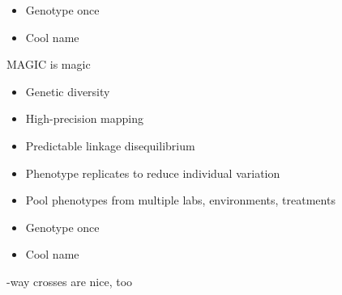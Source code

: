 \documentclass[12pt]{article}
\newcommand{\headsize}{\fontsize{35}{35} \selectfont}
\newcommand{\smallsize}{\fontsize{25}{30} \selectfont}
\begin{document}
{\begin{minipage}{10in}
\begin{itemize}
\item Genotype once

\color{mybgcolor}
\item Cool name

\end{itemize}
\end{minipage}



\newpage

\addtocounter{page}{-1}

\headsize \color{myyellow}
\hfill \begin{minipage}{5.75in}
\centering
MAGIC is magic
\end{minipage}

\vspace{25mm}

\color{mywhite}
\smallsize

\hfill \begin{minipage}{10in}
\begin{itemize}
\itemsep24pt
\item Genetic diversity

\item High-precision mapping

\item Predictable linkage disequilibrium

\item Phenotype replicates to reduce individual variation

\item Pool phenotypes from multiple labs, environments, treatments

\item Genotype once

\color{myblue}
\item Cool name

\end{itemize}
\end{minipage}

\newpage


\headsize \color{myyellow}
\hfill \begin{minipage}{6.25in}
-way crosses are nice, too
\end{minipage}

\vspace{35mm}

\color{mywhite}
\smallsize

}
\end{document}
